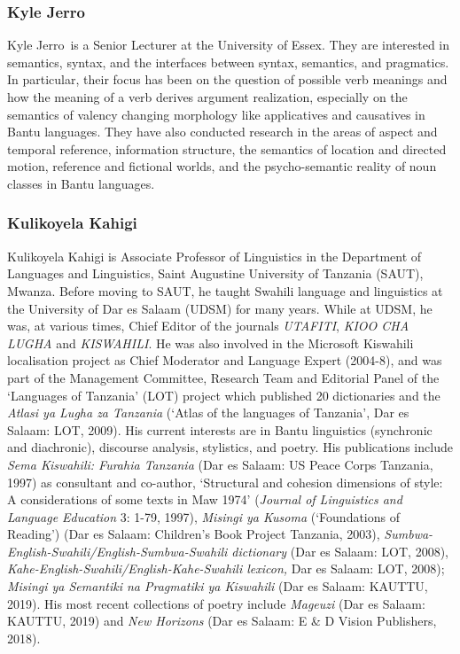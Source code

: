 \subsubsection*{Kyle Jerro  }
Kyle Jerro~is a Senior Lecturer at the University of Essex. They are interested in semantics, syntax, and the interfaces between syntax, semantics, and pragmatics. In particular, their focus has been on the question of possible verb meanings and how the meaning of a verb derives argument realization, especially on the semantics of valency changing morphology like applicatives and causatives in Bantu languages. They have also conducted research in the areas of aspect and temporal reference, information structure, the semantics of location and directed motion, reference and fictional worlds, and the psycho-semantic reality of noun classes in Bantu languages.~

\subsubsection*{Kulikoyela Kahigi}
Kulikoyela Kahigi is Associate Professor of Linguistics in the Department of Languages and Linguistics, Saint Augustine University of Tanzania (SAUT), Mwanza. Before moving to SAUT, he taught Swahili language and linguistics at the University of Dar es Salaam (UDSM) for many years. While at UDSM, he was, at various times, Chief Editor of the journals \textit{UTAFITI}, \textit{KIOO CHA LUGHA} and \textit{KISWAHILI}. He was also involved in the Microsoft Kiswahili localisation project as Chief Moderator and Language Expert (2004-8), and was part of the Management Committee, Research Team and Editorial Panel of the ‘Languages of Tanzania’ (LOT) project which published 20 dictionaries and the \textit{Atlasi ya Lugha za Tanzania} (‘Atlas of the languages of Tanzania’, Dar es Salaam: LOT, 2009). His current interests are in Bantu linguistics (synchronic and diachronic), discourse analysis, stylistics, and poetry. His publications include \textit{Sema Kiswahili: Furahia Tanzania} (Dar es Salaam: US Peace Corps Tanzania, 1997) as consultant and co-author, ‘Structural and cohesion dimensions of style: A considerations of some texts in  {Maw 1974}’ (\textit{Journal of Linguistics and Language Education} 3: 1-79, 1997), \textit{Misingi ya Kusoma} (‘Foundations of Reading’) (Dar es Salaam: Children’s Book Project Tanzania, 2003), \textit{Sumbwa-English-Swahili/English-Sumbwa-Swahili dictionary} (Dar es Salaam: LOT, 2008), \textit{Kahe-English-Swahili/English-Kahe-Swahili lexicon,} Dar es Salaam: LOT, 2008); \textit{Misingi ya Semantiki na Pragmatiki ya Kiswahili} (Dar es Salaam: KAUTTU, 2019). His most recent collections of poetry include \textit{Mageuzi} (Dar es Salaam: KAUTTU, 2019) and \textit{New Horizons} (Dar es Salaam: E \& D Vision Publishers, 2018).

